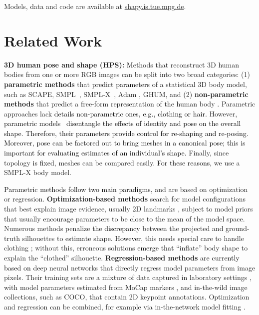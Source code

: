 \documentclass[10pt,twocolumn,letterpaper]{article}
\newcommand{\zheading}[1]{\textbf{#1:}}
\newcommand{\TODO}[1]{\xspace{\color{red} #1}\xspace}
\renewcommand{\TODO}[1]{\xspace{\color{black} #1}\xspace}
\newcommand{\websiteURL}{\mbox{\href{https://shapy.is.tue.mpg.de}{shapy.is.tue.mpg.de}}}
\newcommand{\twoD}{2D\xspace}
\newcommand{\threeD}{3D\xspace}
\newcommand{\scape}{\mbox{SCAPE}\xspace}
\newcommand{\smplx}{\mbox{SMPL-X}\xspace}
\newcommand{\smplX}{\smplx}
\newcommand{\groundtruth}{\mbox{ground-truth}\xspace}
\newcommand{\coco}{\mbox{COCO}\xspace}
\newcommand{\ghum}{\mbox{GHUM}\xspace}
\newcommand{\smpl}{\mbox{SMPL}\xspace}
\newcommand{\mocap}{\mbox{MoCap}\xspace}
\newcommand{\inthewild}{\mbox{in-the-wild}\xspace}
\renewcommand{\eg}{\mbox{e.g.}\xspace}
\newcommand{\rgb}{\mbox{RGB}\xspace}
\newcommand{\cameraready}[1]{\textcolor{Fuchsia}{{#1}}\xspace}
\renewcommand{\cameraready}[1]{\textcolor{black}{{#1}}\xspace}
\begin{document}
\smallskip
\noindent
\TODO{Models}, data and code are available at \websiteURL. 

 \section{Related Work}

\zheading{\threeD human pose and shape (HPS)} Methods that reconstruct \threeD human bodies from one or more \rgb images can be split into two broad categories: 
(1) \textbf{parametric methods} that \cameraready{predict parameters of}
a statistical \threeD body model, such as \scape \cite{anguelov2005scape}, \smpl~\cite{SMPL:2015}, \smplX~\cite{Pavlakos2019_smplifyx}, Adam \cite{Joo2018_adam}, \ghum \cite{xu2020ghum}, 
and
(2) \textbf{non-parametric methods} that predict a free-form representation of the human body
\cameraready{\cite{varol2018bodynet,saito2020pifuhd,Jafarian_2021_CVPR,xiu2022icon}.}
Parametric approaches lack \cameraready{details \wrt non-parametric ones, \eg, clothing or hair.} However, \cameraready{parametric models}~
\cameraready{disentangle the effects of identity and pose on the overall shape}.
\cameraready{Therefore, their parameters provide control for re-shaping and re-posing}. 
\cameraready{Moreover, pose can be factored out to bring meshes in a canonical pose; this is important for evaluating estimates of an 
individual's shape.} 
Finally, since
topology
\cameraready{is fixed}, meshes can be compared easily. 
\cameraready{For these reasons,} 
we use a \smplx body model.

\cameraready{Parametric methods
follow two main paradigms,} and are based on optimization or regression. 
\textbf{Optimization-based methods} \cite{balan2007detailed,bogo2016keep,guan_iccv_scape_2009, Pavlakos2019_smplifyx} search for model configurations that best explain image evidence, usually \twoD landmarks \cite{OpenPose_PAMI}, subject to model priors that \TODO{usually encourage parameters to be close to the mean of the model space.} 
Numerous methods penalize \cameraready{the discrepancy} 
between the projected and \groundtruth silhouettes \cite{MuVS_3DV_2017,lassner2017unite} to 
\cameraready{estimate} 
shape.
\cameraready{However,}
this needs special care to handle clothing \cite{Balan:ECCV}; 
without this, erroneous solutions \cameraready{emerge that} 
\TODO{``inflate'' body shape to explain the ``clothed'' silhouette.} 
\textbf{Regression-based methods} \cite{Choutas2020_expose,georgakis2020hierarchical,jiang2020multiperson,Kanazawa2018_hmr,Kolotouros2019_spin,Liang_2019_ICCV,VIBE:CVPR:2020,mueller2021tuch,zanfir2020weakly} 
\cameraready{are currently based on} deep neural networks that directly regress model parameters from image pixels.
Their training sets are a mixture of data captured in laboratory settings \cite{ionescu2013human36m,sigal_ijcv_10b}, with model parameters estimated from \mocap markers \cite{AMASS:ICCV:2019}, and \inthewild image collections, such as \coco \cite{lin2014coco},  that contain \twoD keypoint annotations. 
Optimization and regression can be combined, for example via in-the-\cameraready{network} model fitting \cite{Kolotouros2019_spin,mueller2021tuch}.
\end{document}

